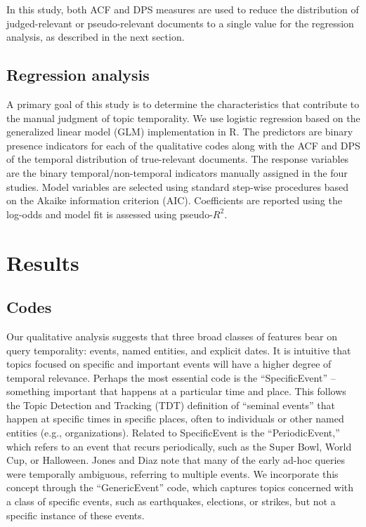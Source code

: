 \documentclass{sig-alternate}
\begin{document}
In this study, both ACF and DPS measures are used to reduce the distribution of judged-relevant or pseudo-relevant documents to a single value for the regression analysis, as described in the next section.

\subsection{Regression analysis}

A primary goal of this study is to determine the characteristics that contribute to the manual judgment of topic temporality. We use logistic regression based on the generalized linear model (GLM) implementation in R. The predictors are binary presence indicators for each of the qualitative codes along with the ACF and DPS of the temporal distribution of true-relevant documents.  The response variables are the binary temporal/non-temporal indicators manually assigned in the four studies.  Model variables are selected using standard step-wise procedures based on the Akaike information criterion (AIC). Coefficients are reported using the log-odds and model fit is assessed using pseudo-$R^2$.

\section{Results}


\subsection{Codes}

Our qualitative analysis suggests that three broad classes of features bear on query temporality: events, named entities, and explicit dates. It is intuitive that topics focused on specific and important events will have a higher degree of temporal relevance. Perhaps the most essential code is the ``SpecificEvent'' -- something important that happens at a particular time and place.  This follows the Topic Detection and Tracking (TDT) definition \cite{TDT2004} of ``seminal events'' that happen at specific times in specific places, often to individuals or other named entities (e.g., organizations).  Related to SpecificEvent is the ``PeriodicEvent,'' which refers to an event that recurs periodically, such as the Super Bowl, World Cup, or Halloween. Jones and Diaz \cite{Jones2007} note that many of the early ad-hoc queries were temporally ambiguous, referring to multiple events. We incorporate this concept through the ``GenericEvent'' code, which captures topics concerned with a class of specific events, such as earthquakes, elections, or strikes, but not a specific instance of these events. 
\end{document}
